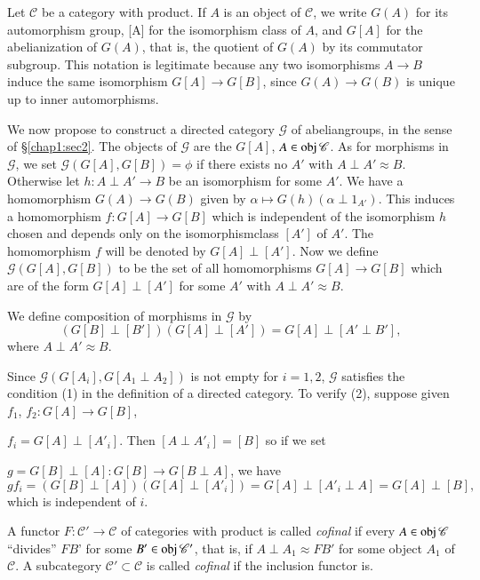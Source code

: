 Let $\mathscr{C}$ be a category with product. If $A$ is an object of
$\mathscr{C}$, we write $G(A)$ for its automorphism group, [A] for the
isomorphism class of $A$, and $G[A]$ for the abelianization of
$G(A)$, that is, the quotient of $G(A)$ by its commutator
subgroup. This notation is legitimate because any two isomorphisms $A
\to B$ induce the same isomorphism $G[A] \to G[B]$, since $G(A) \to
G(B)$ is unique up to inner automorphisms. 
 
 We now propose to construct a directed category $\mathscr{G}$ of
 abelian\break groups, in the sense of \S \ref{chap1:sec2}. The objects of
 $\mathscr{G}$ 
 are the $G [A]$, $A \in \operatorname{obj} \mathscr{C}$. As for morphisms in
 $\mathscr{G}$, we set $\mathscr{G} (G[A],G[B]) = \phi$ if there
 exists no $A'$ with $A \perp A' \approx B$. Otherwise let $h : A \perp A'
 \to B$ be an isomorphism for some $A'$. We have a homomorphism $G(A)
 \to G(B)$ given by $\alpha \mapsto G(h) (\alpha \perp 1_{A'})$. This
 induces a homomorphism $f : G[A] \to G[B]$ which is independent of
 the isomorphism $h$ chosen and depends only on the
 isomorphism\pageoriginale class 
 $[A']$ of $A'$. The homomorphism $f$ will be denoted by $G[A] \perp
 [A']$. Now we define $\mathscr{G}(G [A], G [B])$ to be the set of all
 homomorphisms $G[A] \to G[B]$ which are of the form $G[A] \perp [A']$
 for some $A'$ with $A \perp A' \approx B$. 
 
 We define composition of morphisms in $\mathscr{G}$ by
 $$
 (G[B] \perp [B'] ) (G [A] \perp [A']) = G [ A] \perp [A' \perp B'],
 $$
 where $A \perp A' \approx B$.
 
 Since $\mathscr{G} (G [A_i], G[A_1 \perp A_2])$ is not empty for $i =
 1, 2$, $\mathscr{G}$ satisfies the condition (1) in the definition
 of a directed category. To verify (2), suppose given $f_1$, $f_2:
 G[A] \to G[B]$, 
 
 $f_i = G[A] \perp [A'_i]$. Then $[A \perp A'_i] =[B]$ so if we set  
 
 $g = G[B] \perp [A]: G[B] \to G[B \perp A]$, we have  
$$
gf_i = (G[B] \perp [A]) ( G[A] \perp [A'_i]) = G[A] \perp [A'_i \perp
   A] = G[A] \perp [B], 
$$
which is independent of $i$.

\begin{defi*}%
A functor $F : \mathscr{C}' \to \mathscr{C}$ of categories with
product is called {\em cofinal} if every $A \in \operatorname{obj} \mathscr{C}$
``divides'' $FB$' for some $B' \in \operatorname{obj} \mathscr{C}'$, that is, if $A
\perp A_1 \approx FB'$ for some object $A_1$ of $\mathscr{C}$. A
subcategory $\mathscr{C}' \subset \mathscr{C}$ is called {\em cofinal
} if the inclusion functor is. 
\end{defi*}

